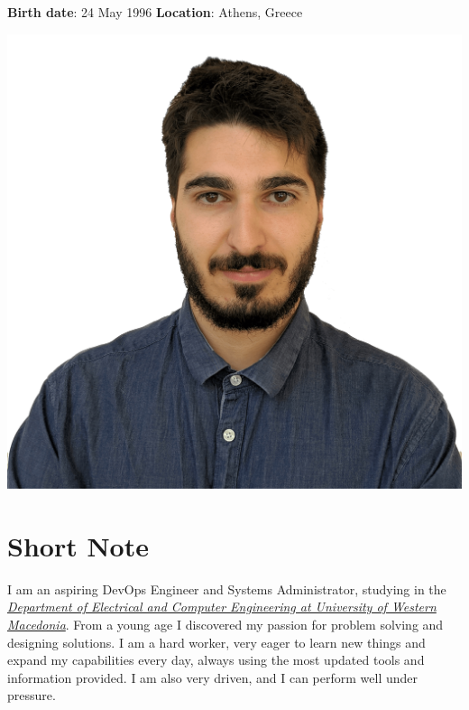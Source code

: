 \documentclass{mycv}
\begin{document}
	\pagestyle{empty}
	\begin{minipage}{0.69\textwidth}
		\begin{flushleft}
			\centering
			{\bf Birth date}: 24 May 1996 {\Large\textperiodcentered} {\bf Location}: Athens, Greece
		\end{flushleft}
	\end{minipage}
	\begin{minipage}{0.3\textwidth}
		\begin{flushright}
			\includegraphics[scale=0.05]{assets/christos.png}
		\end{flushright}
	\end{minipage}
	\vspace*{-0.5cm}
	\section{Short Note}
	\textnormal I am an aspiring DevOps Engineer and Systems Administrator, studying in the \href{https://ece.uowm.gr/?lan=en}{\textit{Department of Electrical and Computer Engineering at University of Western Macedonia}}. From a young age I discovered my passion for problem solving and designing solutions. I am a hard worker, very eager to learn new things and expand my capabilities every day, always using the most updated tools and information provided. I am also very driven, and I can perform well under pressure.
\end{document}
